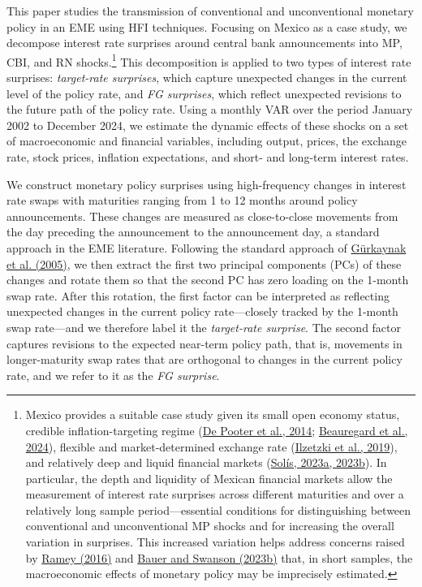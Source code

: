 \documentclass[12pt, reqno]{article}
\begin{document}
This paper studies the transmission of conventional and unconventional monetary policy in an EME using HFI techniques. Focusing on Mexico as a case study, we decompose interest rate surprises around central bank announcements into MP, CBI, and RN shocks.\footnote{Mexico provides a suitable case study given its small open economy status, credible inflation-targeting regime (\hyperlink{De Pooter et al. (2014)}{De Pooter et al., 2014}; \hyperlink{Beauregard et al. (2024)}{Beauregard et al., 2024}), flexible and market-determined exchange rate (\hyperlink{Ilzetzki et al. (2019)}{Ilzetzki et al., 2019}), and relatively deep and liquid financial markets (\hyperlink{Solis (2023b)}{Solís, 2023a, 2023b}). In particular, the depth and liquidity of Mexican financial markets allow the measurement of interest rate surprises across different maturities and over a relatively long sample period—essential conditions for distinguishing between conventional and unconventional MP shocks and for increasing the overall variation in surprises. This increased variation helps address concerns raised by \hyperlink{Ramey (2016)}{Ramey (2016)} and \hyperlink{Bauer and Swanson (2023b)}{Bauer and Swanson (2023b)} that, in short samples, the macroeconomic effects of monetary policy may be imprecisely estimated.} This decomposition is applied to two types of interest rate surprises: \emph{target-rate surprises}, which capture unexpected changes in the current level of the policy rate, and \emph{FG surprises}, which reflect unexpected revisions to the future path of the policy rate. Using a monthly VAR over the period January 2002 to December 2024, we estimate the dynamic effects of these shocks on a set of macroeconomic and financial variables, including output, prices, the exchange rate, stock prices, inflation expectations, and short- and long-term interest rates.

We construct monetary policy surprises using high-frequency changes in interest rate swaps with maturities ranging from 1 to 12 months around policy announcements. These changes are measured as close-to-close movements from the day preceding the announcement to the announcement day, a standard approach in the EME literature. Following the standard approach of \hyperlink{Gürkaynak et al. (2005)}{Gürkaynak et al. (2005)}, we then extract the first two principal components (PCs) of these changes and rotate them so that the second PC has zero loading on the 1-month swap rate. After this rotation, the first factor can be interpreted as reflecting unexpected changes in the current policy rate—closely tracked by the 1-month swap rate—and we therefore label it the \emph{target-rate surprise}. The second factor captures revisions to the expected near-term policy path, that is, movements in longer-maturity swap rates that are orthogonal to changes in the current policy rate, and we refer to it as the \emph{FG surprise}. 
\end{document}
